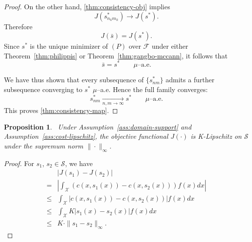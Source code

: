 \documentclass[12pt,leqno]{amsart}
\newtheorem{theorem}{Theorem}
\newtheorem{proposition}{Proposition}
\begin{document}
\begin{proof}
On the other hand, \ref{thm:consistency-obj} implies
\[
J(s_{n_km_k}^*) \to J(s^*).
\]
Therefore
\[
J(\bar s)=J(s^*).
\]
Since $s^*$ is the unique minimizer of $(P)$ over $\mathcal F$
under either Theorem~\ref{thm:philippis} or
Theorem~\ref{thm:gangbo-mccann}, it follows that
\[
\bar s = s^*
\qquad \mu\text{--a.e.}
\]

We have thus shown that every subsequence of $\{s_{nm}^*\}$ admits a
further subsequence converging to $s^*$ $\mu$--a.e. Hence the full
family converges:
\[
s_{nm}^* \xrightarrow[n,m\to\infty]{} s^*
\qquad \mu\text{--a.e.}
\]
This proves \ref{thm:consistency-map}.
\end{proof}

\begin{proposition}~\label{prop: obj-continuity} 
Under Assumption~\ref{ass:domain-support} and Assumption~\ref{ass:cost-lipschitz}, the objective functional $J(\cdot)$ is K-Lipschitz on $\mathcal{S}$ under the supremum norm $\|\cdot\|_{\infty}$.
\end{proposition}
\begin{proof}
For $s_1$, $s_2\in\mathcal{S}$, we have
    \begin{align*}
        &\left|J(s_1)-J(s_2)\right|\\
        =&\left|\int_{\mathcal{X}} \left(c(x, s_1(x))-c(x, s_2(x))\right) f(x)dx\right|\\
        \leq&\int_{\mathcal{X}} \left|c(x, s_1(x))-c(x, s_2(x))\right| f(x)dx\\
        \leq&\int_{\mathcal{X}} K\left|s_1(x)-s_2(x)\right| f(x)dx\\
        \leq&K\cdot\|s_1-s_2\|_{\infty}.
    \end{align*}
\end{proof}
\end{document}
